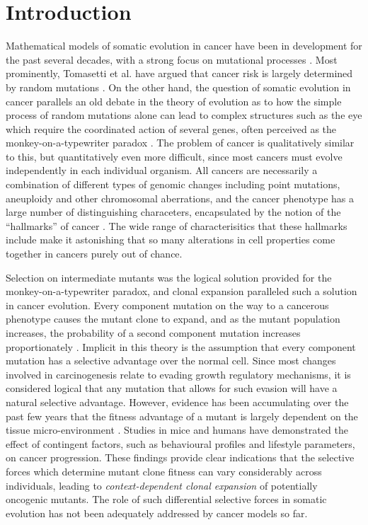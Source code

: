 \documentclass[12pt,onecolumn,twoside]{article}
\begin{document}
\section{Introduction}

Mathematical models of somatic evolution in cancer have been in development for the past several decades, with a strong focus on mutational processes \autocite{ARMITAGE1954, McFarland2013, Blokzijl2016, Mina2017}. Most prominently, Tomasetti et al. have argued that cancer risk is largely determined by random mutations \autocite{Tomasetti78, Tomasetti2017}. On the other hand, the question of somatic evolution in cancer parallels an old debate in the theory of evolution as to how the simple process of random mutations alone can lead to complex structures such as the eye which require the coordinated action of several genes, often perceived as the monkey-on-a-typewriter paradox \autocite{Dawkins1996}. The problem of cancer is qualitatively similar to this, but quantitatively even more difficult, since most cancers must evolve independently in each individual organism. All cancers are necessarily a combination of different types of genomic changes including point mutations, aneuploidy and other chromosomal aberrations, and the cancer phenotype has a large number of distinguishing characeters, encapsulated by the notion of the ``hallmarks'' of cancer \autocite{Hanahan2000, Schafer2008, Hanahan2011}. The wide range of characterisitics that these hallmarks include make it astonishing that so many alterations in cell properties come together in cancers purely out of chance.

Selection on intermediate mutants was the logical solution provided for the monkey-on-a-typewriter paradox, and clonal expansion paralleled such a solution in cancer evolution. Every component mutation on the way to a cancerous phenotype causes the mutant clone to expand, and as the mutant population increases, the probability of a second component mutation increases proportionately \autocite{Nowell1976}. Implicit in this theory is the assumption that every component mutation has a selective advantage over the normal cell. Since most changes involved in carcinogenesis relate to evading growth regulatory mechanisms, it is considered logical that any mutation that allows for such evasion will have a natural selective advantage. However, evidence has been accumulating over the past few years that the fitness advantage of a mutant is largely dependent on the tissue micro-environment \autocite{Hanahan2012, Pietras2010}. Studies in mice \autocite{Cao2010} and humans \autocite{Rundqvist2013} have demonstrated the effect of contingent factors, such as behavioural profiles and lifestyle parameters, on cancer progression. These findings provide clear indications that the selective forces which determine mutant clone fitness can vary considerably across individuals, leading to \textit{context-dependent clonal expansion} of potentially oncogenic mutants. The role of such differential selective forces in somatic evolution has not been adequately addressed by cancer models so far.
\end{document}
